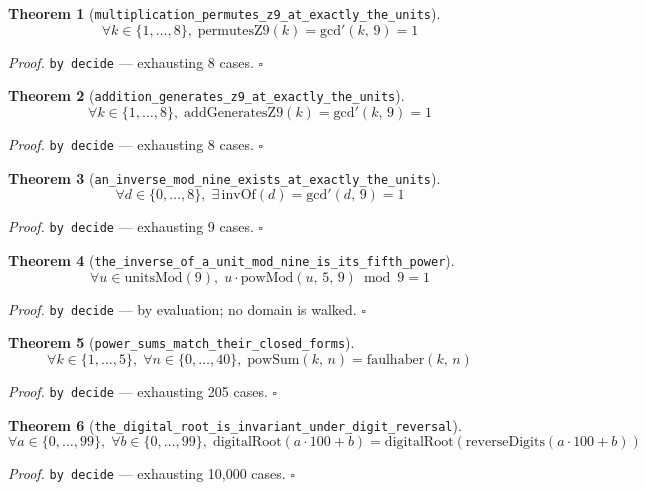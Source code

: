 \documentclass[11pt]{article}
\newtheorem{theorem}{Theorem}[section]
\begin{document}
\begin{theorem}[\texttt{multiplication\_permutes\_z9\_at\_exactly\_the\_units}]
\[ \forall k \in \{1,\dots,8\},\; \mathrm{permutesZ9}\mathopen{}\left(k\right) = \mathrm{gcd'}\mathopen{}\left(k,\,9\right) = 1 \]
\end{theorem}
\noindent\emph{Proof.} \texttt{by decide} --- exhausting 8 cases. \hfill$\square$

\begin{theorem}[\texttt{addition\_generates\_z9\_at\_exactly\_the\_units}]
\[ \forall k \in \{1,\dots,8\},\; \mathrm{addGeneratesZ9}\mathopen{}\left(k\right) = \mathrm{gcd'}\mathopen{}\left(k,\,9\right) = 1 \]
\end{theorem}
\noindent\emph{Proof.} \texttt{by decide} --- exhausting 8 cases. \hfill$\square$

\begin{theorem}[\texttt{an\_inverse\_mod\_nine\_exists\_at\_exactly\_the\_units}]
\[ \forall d \in \{0,\dots,8\},\; \exists\,\mathrm{invOf}\mathopen{}\left(d\right) = \mathrm{gcd'}\mathopen{}\left(d,\,9\right) = 1 \]
\end{theorem}
\noindent\emph{Proof.} \texttt{by decide} --- exhausting 9 cases. \hfill$\square$

\begin{theorem}[\texttt{the\_inverse\_of\_a\_unit\_mod\_nine\_is\_its\_fifth\_power}]
\[ \forall u \in \mathrm{unitsMod}\mathopen{}\left(9\right),\; u \cdot \mathrm{powMod}\mathopen{}\left(u,\,5,\,9\right) \bmod 9 = 1 \]
\end{theorem}
\noindent\emph{Proof.} \texttt{by decide} --- by evaluation; no domain is walked. \hfill$\square$

\begin{theorem}[\texttt{power\_sums\_match\_their\_closed\_forms}]
\[ \forall k \in \{1,\dots,5\},\; \forall n \in \{0,\dots,40\},\; \mathrm{powSum}\mathopen{}\left(k,\,n\right) = \mathrm{faulhaber}\mathopen{}\left(k,\,n\right) \]
\end{theorem}
\noindent\emph{Proof.} \texttt{by decide} --- exhausting 205 cases. \hfill$\square$

\begin{theorem}[\texttt{the\_digital\_root\_is\_invariant\_under\_digit\_reversal}]
\[ \forall a \in \{0,\dots,99\},\; \forall b \in \{0,\dots,99\},\; \mathrm{digitalRoot}\mathopen{}\left(a \cdot 100 + b\right) = \mathrm{digitalRoot}\mathopen{}\left(\mathrm{reverseDigits}\mathopen{}\left(a \cdot 100 + b\right)\right) \]
\end{theorem}
\noindent\emph{Proof.} \texttt{by decide} --- exhausting 10,000 cases. \hfill$\square$
\end{document}
